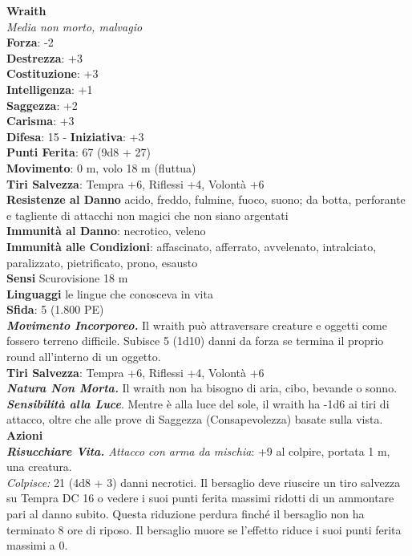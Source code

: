 \begin{multicols}{2}
\medskip\textbf{Wraith}\\
\emph{Media non morto, malvagio}\\
\textbf{Forza}: -2\\
\textbf{Destrezza}: +3\\
\textbf{Costituzione}: +3\\
\textbf{Intelligenza}: +1\\
\textbf{Saggezza}: +2\\
\textbf{Carisma}: +3\\
\textbf{Difesa}: 15 - \textbf{Iniziativa}: +3\\
\textbf{Punti Ferita}: 67 (9d8 + 27)\\
\textbf{Movimento}: 0 m, volo 18 m (fluttua)\\
\textbf{Tiri Salvezza}: Tempra +6, Riflessi +4, Volontà +6\\
\textbf{Resistenze al Danno} acido, freddo, fulmine, fuoco, suono; da botta, perforante e tagliente di attacchi non magici che non siano argentati\\
\textbf{Immunità al Danno}: necrotico, veleno\\
\textbf{Immunità alle Condizioni}: affascinato, afferrato, avvelenato, intralciato, paralizzato, pietrificato, prono, esausto\\
\textbf{Sensi} Scurovisione 18 m\\
\textbf{Linguaggi} le lingue che conosceva in vita\\
\textbf{Sfida}: 5 (1.800 PE)\smallskip\\
\emph{\textbf{Movimento Incorporeo.}} Il wraith può attraversare creature e oggetti come fossero terreno difficile. Subisce 5 (1d10) danni da forza se termina il proprio round all'interno di un oggetto.\\
\textbf{Tiri Salvezza}: Tempra +6, Riflessi +4, Volontà +6\\
\emph{\textbf{Natura Non Morta.}} Il wraith non ha bisogno di aria, cibo, bevande o sonno.\\
\emph{\textbf{Sensibilità alla Luce}}. Mentre è alla luce del sole, il wraith ha -1d6 ai tiri di attacco, oltre che alle prove di Saggezza (Consapevolezza) basate sulla vista.\\
\smallskip\textbf{Azioni}\\
\emph{\textbf{Risucchiare Vita.} Attacco con arma da mischia}: +9 al colpire, portata 1 m, una creatura.\\
\emph{Colpisce:} 21 (4d8 + 3) danni necrotici. Il bersaglio deve riuscire un tiro salvezza su Tempra DC  16 o vedere i suoi punti ferita massimi ridotti di un ammontare pari al danno subito. Questa riduzione perdura finché il bersaglio non ha terminato 8 ore di riposo. Il bersaglio muore se l'effetto riduce i suoi punti ferita massimi a 0.\\


\end{multicols}
